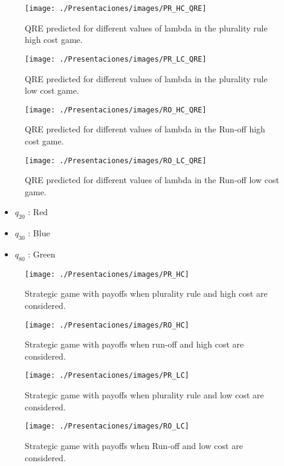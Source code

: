 

\begin{figure}
	\centering
	\texttt{[image: ./Presentaciones/images/PR\_HC\_QRE]}
	\caption[PR HC QRE]{QRE predicted for different values of lambda in the plurality rule high cost game.}
	\label{fig:PR_HC_QRE}
\end{figure}


\begin{figure}
	\centering
	\texttt{[image: ./Presentaciones/images/PR\_LC\_QRE]}
	\caption[PR LC QRE]{QRE predicted for different values of lambda in the plurality rule low cost game.}
	\label{fig:PR_LC_QRE}
\end{figure}

\begin{figure}
	\centering
	\texttt{[image: ./Presentaciones/images/RO\_HC\_QRE]}
	\caption[RO HC QRE]{QRE predicted for different values of lambda in the Run-off high cost game.}
	\label{fig:RO_HC_QRE}
\end{figure}

\begin{figure}
	\centering
	\texttt{[image: ./Presentaciones/images/RO\_LC\_QRE]}
	\caption[RO LC QRE]{QRE predicted for different values of lambda in the Run-off low cost game.}
	\label{fig:RO_LC_QRE}
\end{figure}


\begin{itemize}
	\item $q_{20}$ : Red
	\item $q_{30}$ : Blue 
	\item $q_{80}$ : Green
\end{itemize}

\begin{figure}
	\centering
	\texttt{[image: ./Presentaciones/images/PR\_HC]}
	\caption[PR HC]{Strategic game with payoffs when plurality rule and high cost are considered.}
	\label{fig:PR_HC}
\end{figure}

\begin{figure}
	\centering
	\texttt{[image: ./Presentaciones/images/RO\_HC]}
	\caption[PR HC]{Strategic game with payoffs when run-off and high cost are considered.}
	\label{fig:RO_HC}
\end{figure}

\begin{figure}
	\centering
	\texttt{[image: ./Presentaciones/images/PR\_LC]}
	\caption[PR HC]{Strategic game with payoffs when plurality rule and low cost are considered.}
	\label{fig:PR_LC}
\end{figure}

\begin{figure}
	\centering
	\texttt{[image: ./Presentaciones/images/RO\_LC]}
	\caption[PR HC]{Strategic game with payoffs when Run-off and low cost are considered.}
	\label{fig:RO_LC}
\end{figure}





